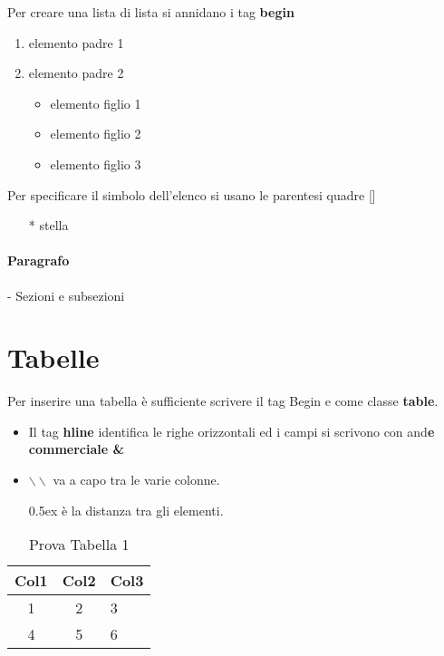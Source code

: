 \documentclass{article}
\begin{document}
Per creare una lista di lista si annidano i tag \textbf{begin}
\begin{enumerate}
\item elemento padre 1
\item elemento padre 2
    \begin{itemize}
        \item elemento figlio 1
        \item elemento figlio 2
        \item elemento figlio 3
    \end{itemize}
\end{enumerate}
Per specificare il simbolo dell'elenco si usano le parentesi quadre []
\begin{itemize}
    \item [*] stella
\end{itemize}

\paragraph{Paragrafo} - Sezioni e subsezioni 


\section{Tabelle}
Per inserire una tabella è sufficiente scrivere il tag Begin e come classe
\textbf{table}.\\
\begin{itemize}
    \item Il tag \textbf{hline} identifica le righe orizzontali ed i campi si scrivono con and\textbf{e commerciale \&}
    \item $\backslash\backslash$ va a capo tra le varie colonne.
    \item [0.5ex] è la distanza tra gli elementi. 
\end{itemize}



\begin{table}[h!]
    \centering
    
    \begin{tabular}{c|c|l}
    \hline
    Col1 & Col2 & Col3 \\[0.5ex]
    \hline\hline
    1   &   2   &   3  \\
    4   &   5   &   6 \\ [5ex]
    \hline %
    \end{tabular}
    \caption{Prova Tabella 1}
    \label{TabellaUno}
\end{table}
\end{document}
